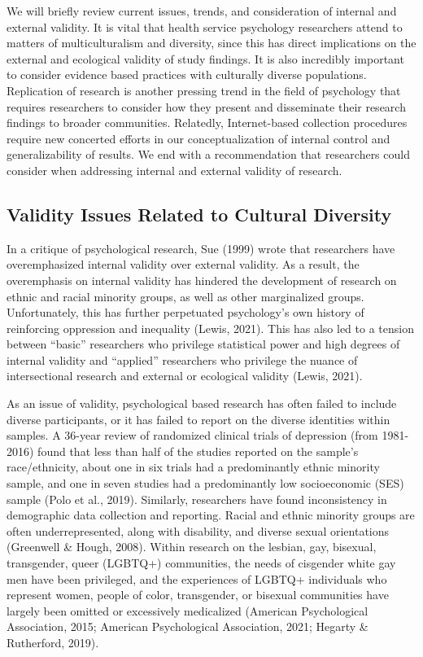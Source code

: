 \documentclass[
  11pt,
]{book}
\begin{document}
We will briefly review current issues, trends, and consideration of internal and external validity. It is vital that health service psychology researchers attend to matters of multiculturalism and diversity, since this has direct implications on the external and ecological validity of study findings. It is also incredibly important to consider evidence based practices with culturally diverse populations. Replication of research is another pressing trend in the field of psychology that requires researchers to consider how they present and disseminate their research findings to broader communities. Relatedly, Internet-based collection procedures require new concerted efforts in our conceptualization of internal control and generalizability of results. We end with a recommendation that researchers could consider when addressing internal and external validity of research.

\subsection{Validity Issues Related to Cultural Diversity}\label{validity-issues-related-to-cultural-diversity}

In a critique of psychological research, Sue (1999) wrote that researchers have overemphasized internal validity over external validity. As a result, the overemphasis on internal validity has hindered the development of research on ethnic and racial minority groups, as well as other marginalized groups. Unfortunately, this has further perpetuated psychology's own history of reinforcing oppression and inequality (Lewis, 2021). This has also led to a tension between ``basic'' researchers who privilege statistical power and high degrees of internal validity and ``applied'' researchers who privilege the nuance of intersectional research and external or ecological validity (Lewis, 2021).

As an issue of validity, psychological based research has often failed to include diverse participants, or it has failed to report on the diverse identities within samples. A 36-year review of randomized clinical trials of depression (from 1981-2016) found that less than half of the studies reported on the sample's race/ethnicity, about one in six trials had a predominantly ethnic minority sample, and one in seven studies had a predominantly low socioeconomic (SES) sample (Polo et al., 2019). Similarly, researchers have found inconsistency in demographic data collection and reporting. Racial and ethnic minority groups are often underrepresented, along with disability, and diverse sexual orientations (Greenwell \& Hough, 2008). Within research on the lesbian, gay, bisexual, transgender, queer (LGBTQ+) communities, the needs of cisgender white gay men have been privileged, and the experiences of LGBTQ+ individuals who represent women, people of color, transgender, or bisexual communities have largely been omitted or excessively medicalized (American Psychological Association, 2015; American Psychological Association, 2021; Hegarty \& Rutherford, 2019).
\end{document}
